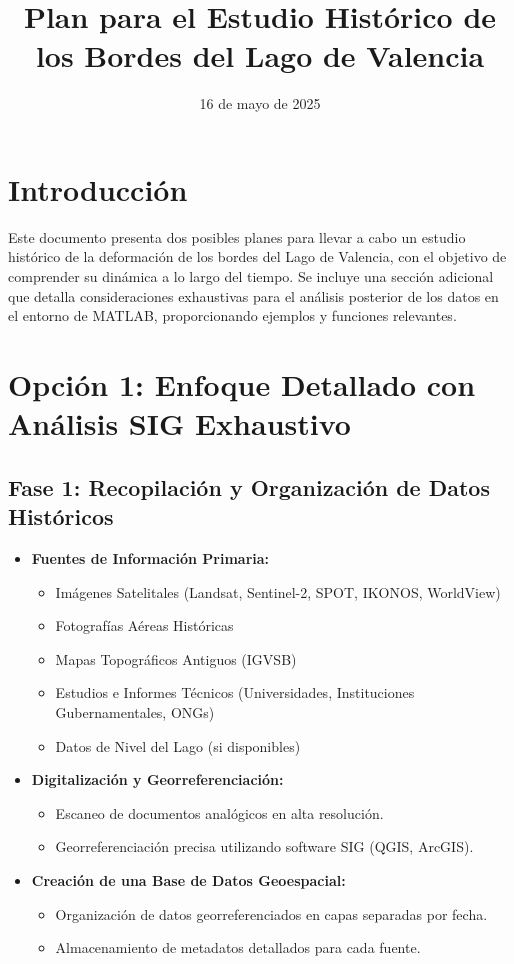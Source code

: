 \documentclass{article}
\title{Plan para el Estudio Histórico de los Bordes del Lago de Valencia}
\date{16 de mayo de 2025}
\begin{document}
\maketitle

\section*{Introducción}

Este documento presenta dos posibles planes para llevar a cabo un estudio histórico de la deformación de los bordes del Lago de Valencia, con el objetivo de comprender su dinámica a lo largo del tiempo. Se incluye una sección adicional que detalla consideraciones exhaustivas para el análisis posterior de los datos en el entorno de MATLAB, proporcionando ejemplos y funciones relevantes.

\section*{Opción 1: Enfoque Detallado con Análisis SIG Exhaustivo}

\subsection*{Fase 1: Recopilación y Organización de Datos Históricos}

\begin{itemize}
    \item \textbf{Fuentes de Información Primaria:}
    \begin{itemize}
        \item Imágenes Satelitales (Landsat, Sentinel-2, SPOT, IKONOS, WorldView)
        \item Fotografías Aéreas Históricas
        \item Mapas Topográficos Antiguos (IGVSB)
        \item Estudios e Informes Técnicos (Universidades, Instituciones Gubernamentales, ONGs)
        \item Datos de Nivel del Lago (si disponibles)
    \end{itemize}
    \item \textbf{Digitalización y Georreferenciación:}
    \begin{itemize}
        \item Escaneo de documentos analógicos en alta resolución.
        \item Georreferenciación precisa utilizando software SIG (QGIS, ArcGIS).
    \end{itemize}
    \item \textbf{Creación de una Base de Datos Geoespacial:}
    \begin{itemize}
        \item Organización de datos georreferenciados en capas separadas por fecha.
        \item Almacenamiento de metadatos detallados para cada fuente.
    \end{itemize}
\end{itemize}
\end{document}
